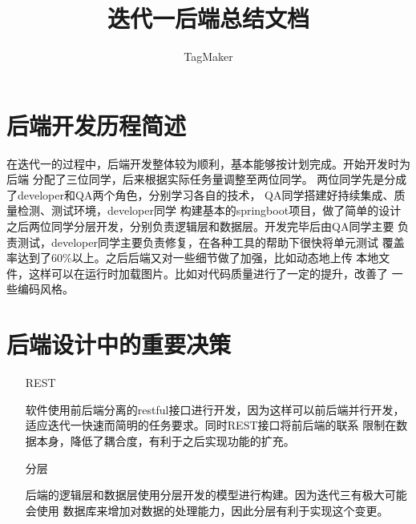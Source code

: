 \documentclass{ctexart}
\author{TagMaker}
\title{迭代一后端总结文档}
\begin{document}
    \maketitle
    \newpage
    \tableofcontents
    \newpage
    \section{后端开发历程简述}
        在迭代一的过程中，后端开发整体较为顺利，基本能够按计划完成。开始开发时为后端
        分配了三位同学，后来根据实际任务量调整至两位同学。
        两位同学先是分成了developer和QA两个角色，分别学习各自的技术，
        QA同学搭建好持续集成、质量检测、测试环境，developer同学
        构建基本的springboot项目，做了简单的设计
        之后两位同学分层开发，分别负责逻辑层和数据层。开发完毕后由QA同学主要
        负责测试，developer同学主要负责修复，在各种工具的帮助下很快将单元测试
        覆盖率达到了60\%以上。之后后端又对一些细节做了加强，比如动态地上传
        本地文件，这样可以在运行时加载图片。比如对代码质量进行了一定的提升，改善了
        一些编码风格。
    
    \section{后端设计中的重要决策}
        \begin{itemize}
            \item[REST] \
            
            软件使用前后端分离的restful接口进行开发，因为这样可以前后端并行开发，
            适应迭代一快速而简明的任务要求。同时REST接口将前后端的联系
            限制在数据本身，降低了耦合度，有利于之后实现功能的扩充。

            \item[分层] \

            后端的逻辑层和数据层使用分层开发的模型进行构建。因为迭代三有极大可能会使用
            数据库来增加对数据的处理能力，因此分层有利于实现这个变更。


        \end{itemize}
    \newpage
\end{document}
